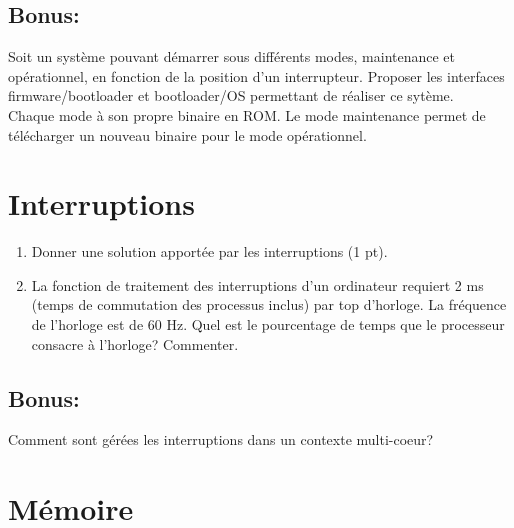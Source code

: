 \subsection*{Bonus:}
Soit un système pouvant démarrer sous différents modes, maintenance et opérationnel, en fonction de la position d'un interrupteur. Proposer les interfaces firmware/bootloader et bootloader/OS permettant de réaliser ce sytème.\\
Chaque mode à son propre binaire en ROM. Le mode maintenance permet de télécharger un nouveau binaire pour le mode opérationnel.

\section{{Interruptions}
         {\hfill{} }}

\begin{enumerate}
\item Donner une solution apportée par les interruptions (1 pt).

\item La fonction de traitement des interruptions d'un ordinateur requiert 2 ms (temps de commutation des processus inclus) par top d'horloge. La fréquence de l'horloge est de 60 Hz. Quel est le pourcentage de temps que le processeur consacre à l'horloge? Commenter.

\end{enumerate}


\subsection*{Bonus:}
Comment sont gérées les interruptions dans un contexte multi-coeur?

\section{{Mémoire}
         {\hfill{} }}

